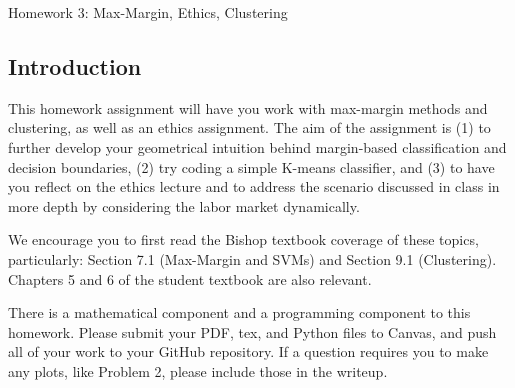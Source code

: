 \documentclass[submit]{harvardml}
\begin{document}
\begin{center}
{\Large Homework 3: Max-Margin, Ethics, Clustering}\\
\end{center}
\subsection*{Introduction}

This homework assignment will have you work with max-margin methods
and clustering, as well as an ethics assignment.  The aim of the
assignment is (1) to further develop your geometrical intuition behind
margin-based classification and decision boundaries, (2) try coding a
simple K-means classifier, and (3) to have you reflect on the ethics
lecture and to address the scenario discussed in class in more depth
by considering the labor market dynamically.

We encourage you to first read the Bishop textbook coverage of these topics,
particularly: Section 7.1 (Max-Margin and SVMs) and Section 9.1 (Clustering).
Chapters 5 and 6 of the student textbook are also relevant.

There is a mathematical component and a programming component to this
homework.  Please submit your PDF, tex, and Python files to Canvas,
and push all of your work to your GitHub repository. If a question
requires you to make any plots, like Problem 2, please include those
in the writeup.
\end{document}
